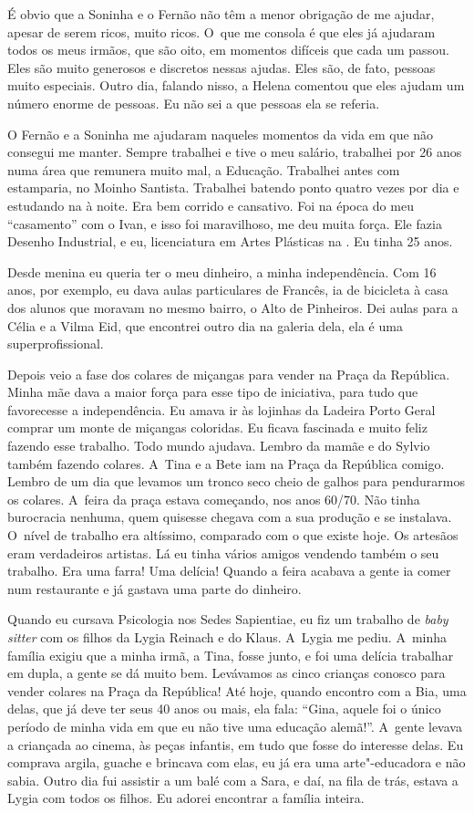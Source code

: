 É obvio que a Soninha e o Fernão não têm a menor obrigação de me ajudar,
apesar de serem ricos, muito ricos. O~que me consola é que eles já
ajudaram todos os meus irmãos, que são oito, em momentos difíceis que
cada um passou. Eles são muito generosos e discretos nessas ajudas. Eles
são, de fato, pessoas muito especiais. Outro dia, falando nisso, a
Helena comentou que eles ajudam um número enorme de pessoas. Eu não sei
a que pessoas ela se referia.

O Fernão e a Soninha me ajudaram naqueles momentos da vida em que não
consegui me manter. Sempre trabalhei e tive o meu salário, trabalhei por
26 anos numa área que remunera muito mal, a Educação. Trabalhei antes
com estamparia, no Moinho Santista. Trabalhei batendo ponto quatro vezes
por dia e estudando na  à noite. Era bem corrido e cansativo. Foi na
época do meu ``casamento'' com o Ivan, e isso foi maravilhoso, me deu
muita força. Ele fazia Desenho Industrial, e eu, licenciatura em Artes
Plásticas na . Eu tinha 25 anos.

Desde menina eu queria ter o meu dinheiro, a minha independência. Com 16
anos, por exemplo, eu dava aulas particulares de Francês, ia de
bicicleta à casa dos alunos que moravam no mesmo bairro, o Alto de
Pinheiros. Dei aulas para a Célia e a Vilma Eid, que encontrei outro dia
na galeria dela, ela é uma superprofissional.

Depois veio a fase dos colares de miçangas para vender na Praça da
República. Minha mãe dava a maior força para esse tipo de iniciativa,
para tudo que favorecesse a independência. Eu amava ir às lojinhas da
Ladeira Porto Geral comprar um monte de miçangas coloridas. Eu ficava
fascinada e muito feliz fazendo esse trabalho. Todo mundo ajudava.
Lembro da mamãe e do Sylvio também fazendo colares. A~Tina e a Bete iam
na Praça da República comigo. Lembro de um dia que levamos um tronco
seco cheio de galhos para pendurarmos os colares. A~feira da praça
estava começando, nos anos 60/70. Não tinha burocracia nenhuma, quem
quisesse chegava com a sua produção e se instalava. O~nível de trabalho
era altíssimo, comparado com o que existe hoje. Os artesãos eram
verdadeiros artistas. Lá eu tinha vários amigos vendendo também o seu
trabalho. Era uma farra! Uma delícia! Quando a feira acabava a gente ia
comer num restaurante e já gastava uma parte do dinheiro.

Quando eu cursava Psicologia nos Sedes Sapientiae, eu fiz um trabalho de
\emph{baby sitter} com os filhos da Lygia Reinach e do Klaus. A~Lygia me
pediu. A~minha família exigiu que a minha irmã, a Tina, fosse junto, e
foi uma delícia trabalhar em dupla, a gente se dá muito bem. Levávamos
as cinco crianças conosco para vender colares na Praça da República! Até
hoje, quando encontro com a Bia, uma delas, que já deve ter seus 40 anos
ou mais, ela fala: ``Gina, aquele foi o único período de minha vida em
que eu não tive uma educação alemã!''. A~gente levava a criançada ao
cinema, às peças infantis, em tudo que fosse do interesse delas. Eu
comprava argila, guache e brincava com elas, eu já era uma
arte"-educadora e não sabia. Outro dia fui assistir a um balé com a Sara,
e daí, na fila de trás, estava a Lygia com todos os filhos. Eu adorei
encontrar a família inteira.

